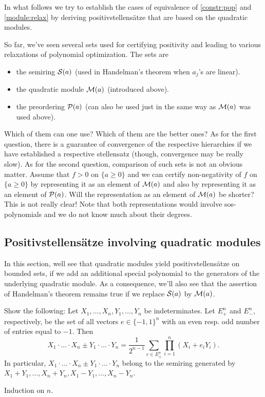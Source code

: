 In what follows we try to establish the cases of equivalence of \eqref{constr:pop} and \eqref{module:relax} by deriving positivstellensätze that are based on the quadratic modules. 

\begin{remark}
	So far, we've seen several sets used for certifying positivity and leading to various relaxations of polynomial optimization. The sets are 
	\begin{itemize}
		\item the semiring $\mathcal{S}(a)$ (used in Handelman's theorem when $a_j$'s are linear). 
		\item the quadratic module $\mathcal{M}(a)$ (introduced above).
		\item the preordering $\mathcal{P}(a)$ (can also be used just in the same way as $\mathcal{M}(a)$ was used above). 
	\end{itemize}
	Which of them can one use? Which of them are the better ones? As for the first question, there is a guarantee of convergence of the respective hierarchies if we have established a respective stellensatz (though, convergence may be really slow). As for the second question, comparison of such sets is not an obvious matter. Assume that $f>0$ on $\{a \ge 0\}$ and we can certify non-negativity of $f$ on $\{a \ge 0\}$ by representing it as an element of $\mathcal{M}(a)$ and also by representing it as an element of $\mathcal{P}(a)$. Will the representation as an element of $\mathcal{M}(a)$ be shorter? This is not really clear! Note that both representations would involve sos-polynomials and we do not know much about their degrees. 
\end{remark}


\subsection{Positivstellensätze involving quadratic modules}

In this section, well see that quadratic modules yield positivstellens\"atze on bounded sets, if we add an additional special polynomial to the generators of the underlying quadratic module. As a consequence, we'll also see that the assertion of Handelman's theorem remains true if we replace $\mathcal{S}(a)$ by $\mathcal{M}(a)$. 

\begin{exercise}
	\label{prop:prod:pm:product}
	Show the following: Let $X_1,\ldots,X_n,Y_1,\ldots,Y_n$ be indeterminates. Let $E_+^n$ and $E_-^n$, respectively, be the set of all vectors $e \in \{-1,1\}^n$ with an even resp. odd number of entries equal to $-1$. Then 
	\[
		X_1 \cdot \ldots \cdot X_n \pm Y_1 \cdot \ldots \cdot Y_n = \frac{1}{2^{n-1}} \sum_{e \in E_\pm^n} \prod_{i=1}^n (X_i + e_i Y_i).
	\]
	In particular, $X_1 \cdot \ldots \cdot X_n \pm Y_1 \cdot \ldots \cdot Y_n$ belong to the semiring generated by $X_1+Y_1,\ldots,X_n+Y_n,X_1 - Y_1,\ldots,X_n-Y_n$. 
\end{exercise}
\begin{solution}
	Induction on $n$. 
\end{solution}

